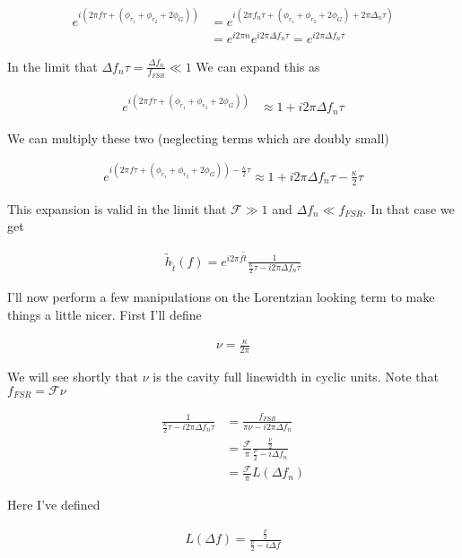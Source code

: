 \documentclass[12pt]{article}
\begin{document}
\begin{align}
e^{i(2\pi f \tau + (\phi_{r_1} + \phi_{r_2} + 2\phi_G))} &= e^{i(2\pi f_n \tau + (\phi_{r_1}+\phi_{r_2}+2\phi_G) + 2\pi \Delta_n \tau)}\\
&= e^{i 2 \pi n} e^{i 2 \pi \Delta f_n \tau} = e^{i 2 \pi \Delta f_n \tau}
\end{align}

In the limit that $\Delta f_n \tau = \frac{\Delta f_n}{f_{FSR}} \ll 1$ We can expand this as 

\begin{align}
e^{i(2\pi f \tau + (\phi_{r_1} + \phi_{r_2} + 2\phi_G))} &\approx 1 + i 2\pi \Delta f_n \tau
\end{align}

We can multiply these two (neglecting terms which are doubly small)

\begin{align}
e^{i\left(2\pi f \tau + (\phi_{r_1} + \phi_{r_2} + 2\phi_G)\right) - \frac{\kappa}{2}\tau} \approx 1 + i 2\pi \Delta f_n \tau - \frac{\kappa}{2} \tau
\end{align}

This expansion is valid in the limit that $\mathcal{F} \gg 1$ and $\Delta f_n \ll f_{FSR}$. In that case we get

\begin{align}
\tilde{h}_{\tilde{t}}(f) = e^{i 2 \pi f \tilde{t}} \frac{1}{\frac{\kappa}{2} \tau - i 2 \pi \Delta f_n \tau}
\end{align}

I'll now perform a few manipulations on the Lorentzian looking term to make things a little nicer. First I'll define

\begin{align}
\nu = \frac{\kappa}{2\pi}
\end{align}

We will see shortly that $\nu$ is the cavity full linewidth in cyclic units. Note that $f_{FSR} = \mathcal{F} \nu$

\begin{align}
\frac{1}{\frac{\kappa}{2} \tau - i 2 \pi \Delta f_n \tau} &= \frac{f_{FSR}}{\pi \nu - i 2 \pi \Delta f_n}\\
&= \frac{\mathcal{F}}{\pi} \frac{\frac{\nu}{2}}{\frac{\nu}{2} - i \Delta f_n}\\
&= \frac{\mathcal{F}}{\pi} L(\Delta f_n)
\end{align}

Here I've defined 

\begin{align}
L(\Delta f) = \frac{\frac{\nu}{2}}{\frac{\nu}{2} - i \Delta f}
\end{align}
\end{document}
